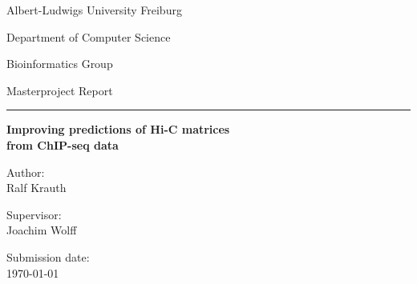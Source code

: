 \begin{titlepage}
 \centering
 Albert-Ludwigs University Freiburg
 
 Department of Computer Science
 
 Bioinformatics Group
 \vspace{4cm}
 
  Masterproject Report
 \vspace{3mm} 
  
 \huge \hrule \vspace{5mm}
 \textbf{Improving predictions of Hi-C matrices \\ from ChIP-seq data}
 
 \hrulefill
 
 \vfill
 \raggedright
 \normalsize
  Author:\\
  Ralf Krauth 
  
  Supervisor:\\
  Joachim Wolff
  
  Submission date:\\
  \today

\end{titlepage}
